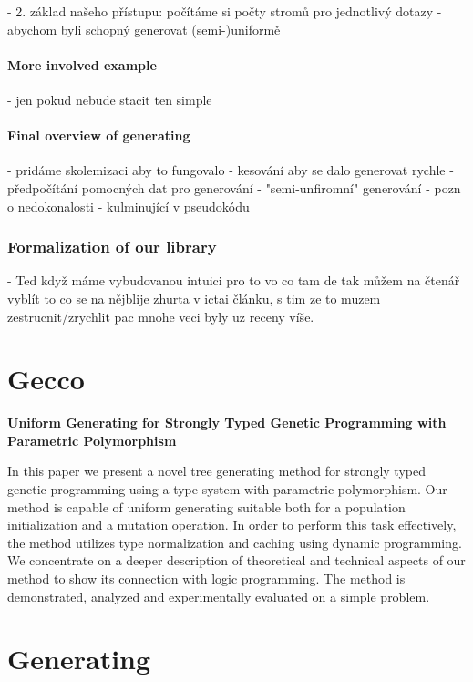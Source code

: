 \documentclass[a4paper,oneside]{memoir}
\begin{document}
- 2. základ našeho přístupu: počítáme si počty stromů pro jednotlivý dotazy 
     - abychom byli schopný generovat (semi-)uniformě

\subsubsection{More involved example}

- jen pokud nebude stacit ten simple

\subsubsection{Final overview of generating}

- pridáme skolemizaci aby to fungovalo
- kesování aby se dalo generovat rychle
    - předpočítání pomocných dat pro generování
    - "semi-unfiromní" generování - pozn o nedokonalosti 
- kulminující v pseudokódu

\subsection{Formalization of our library}

- Ted když máme vybudovanou intuici pro to vo co tam de tak můžem na čtenář vyblít to co se na nějblije zhurta v ictai článku, s tim ze to muzem zestrucnit/zrychlit pac mnohe veci byly uz receny víše.


\chapter{Gecco}

\textbf{Uniform Generating for Strongly Typed Genetic Programming with Parametric Polymorphism}

In this paper we present a novel tree generating method for strongly typed genetic programming using a type system with parametric polymorphism. Our method is capable of uniform generating suitable both for a population initialization and a mutation operation. In order to perform this task effectively, the method utilizes type normalization and caching using dynamic programming. We concentrate on a deeper description of theoretical and technical aspects of our method to show its connection with logic programming. The method is demonstrated, analyzed and experimentally evaluated on a simple problem.


\chapter{Generating}
\end{document}
